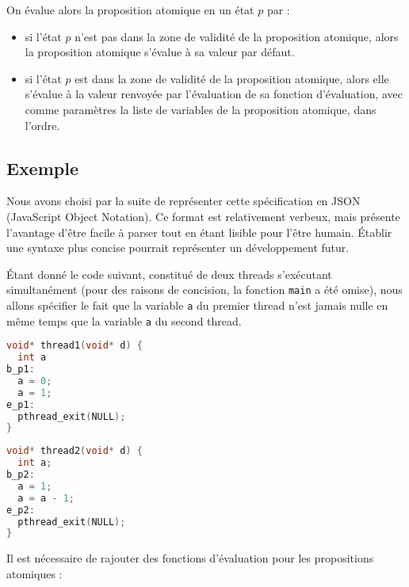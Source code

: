 On évalue alors la proposition atomique en un état \(p\) par :

\begin{itemize}
\item
  si l'état \(p\) n'est pas dans la zone de validité de la proposition
  atomique, alors la proposition atomique s'évalue à sa valeur par
  défaut.
\item
  si l'état \(p\) est dans la zone de validité de la proposition
  atomique, alors elle s'évalue à la valeur renvoyée par l'évaluation de
  sa fonction d'évaluation, avec comme paramètres la liste de variables
  de la proposition atomique, dans l'ordre.
\end{itemize}

\subsection{Exemple}

Nous avons choisi par la suite de représenter cette spécification en
JSON (JavaScript Object Notation)\cite{json}. Ce format est
relativement verbeux, mais présente l'avantage d'être facile à parser
tout en étant lisible pour l'être humain. Établir une syntaxe plus
concise pourrait représenter un développement futur.

Étant donné le code suivant, constitué de deux threads s'exécutant
simultanément (pour des raisons de concision, la fonction
\texttt{main} a été omise), nous allons spécifier le fait que la
variable \texttt{a} du premier thread n'est jamais nulle en même temps que
la variable \texttt{a} du second thread.

\noindent\begin{minipage}{.45\textwidth}
\begin{lstlisting}[language=C, frame=single, caption=Thread 1]
void* thread1(void* d) {
  int a
b_p1:
  a = 0;
  a = 1;
e_p1:
  pthread_exit(NULL);
}
\end{lstlisting}
\end{minipage}\hfill
\begin{minipage}{.45\textwidth}
\begin{lstlisting}[language=C, frame=single, caption=Thread 2]
void* thread2(void* d) {
  int a;
b_p2:
  a = 1;
  a = a - 1;
e_p2:
  pthread_exit(NULL);
}
\end{lstlisting}
\end{minipage}

Il est nécessaire de rajouter des fonctions d'évaluation pour les
propositions atomiques :

